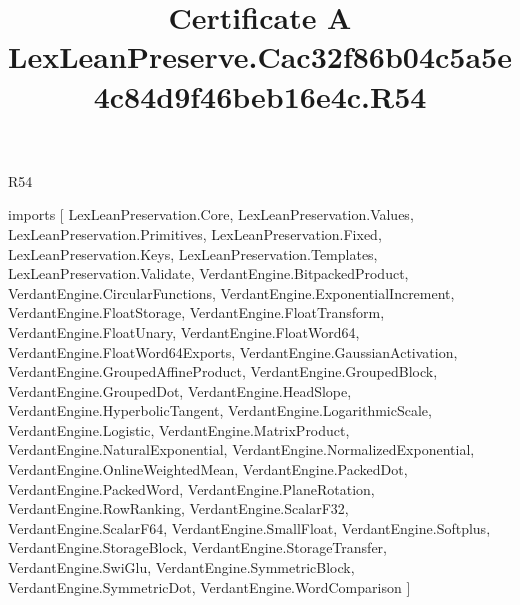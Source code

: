 \begin{lexlean}{R54}
\title{Certificate A LexLeanPreserve.Cac32f86b04c5a5e4c84d9f46beb16e4c.R54}
\begin{coremodule}
imports [
  LexLeanPreservation.Core,
  LexLeanPreservation.Values,
  LexLeanPreservation.Primitives,
  LexLeanPreservation.Fixed,
  LexLeanPreservation.Keys,
  LexLeanPreservation.Templates,
  LexLeanPreservation.Validate,
  VerdantEngine.BitpackedProduct,
  VerdantEngine.CircularFunctions,
  VerdantEngine.ExponentialIncrement,
  VerdantEngine.FloatStorage,
  VerdantEngine.FloatTransform,
  VerdantEngine.FloatUnary,
  VerdantEngine.FloatWord64,
  VerdantEngine.FloatWord64Exports,
  VerdantEngine.GaussianActivation,
  VerdantEngine.GroupedAffineProduct,
  VerdantEngine.GroupedBlock,
  VerdantEngine.GroupedDot,
  VerdantEngine.HeadSlope,
  VerdantEngine.HyperbolicTangent,
  VerdantEngine.LogarithmicScale,
  VerdantEngine.Logistic,
  VerdantEngine.MatrixProduct,
  VerdantEngine.NaturalExponential,
  VerdantEngine.NormalizedExponential,
  VerdantEngine.OnlineWeightedMean,
  VerdantEngine.PackedDot,
  VerdantEngine.PackedWord,
  VerdantEngine.PlaneRotation,
  VerdantEngine.RowRanking,
  VerdantEngine.ScalarF32,
  VerdantEngine.ScalarF64,
  VerdantEngine.SmallFloat,
  VerdantEngine.Softplus,
  VerdantEngine.StorageBlock,
  VerdantEngine.StorageTransfer,
  VerdantEngine.SwiGlu,
  VerdantEngine.SymmetricBlock,
  VerdantEngine.SymmetricDot,
  VerdantEngine.WordComparison
]


\end{coremodule}
\end{lexlean}
